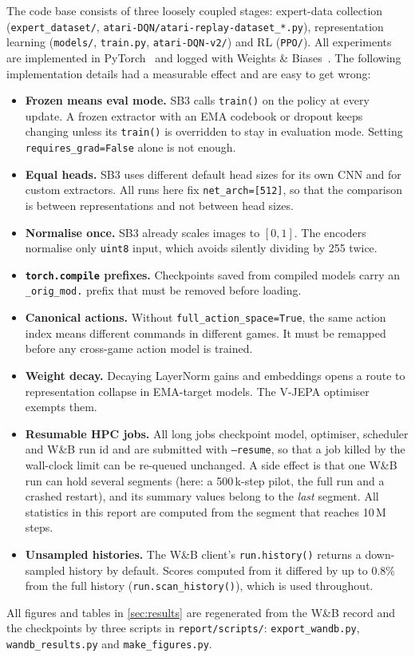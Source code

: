 \documentclass[runningheads]{llncs}
\begin{document}
The code base consists of three loosely coupled stages: expert-data collection
(\texttt{expert\_dataset/}, \texttt{atari-DQN/atari-replay-dataset\_*.py}), representation
learning (\texttt{models/}, \texttt{train.py}, \texttt{atari-DQN-v2/}) and RL
(\texttt{PPO/}). All experiments are implemented in PyTorch~\cite{paszke2019pytorch} and
logged with Weights \& Biases~\cite{biewald2020wandb}. The following implementation
details had a measurable effect and are easy to get wrong:
\begin{itemize}
  \item \textbf{Frozen means eval mode.} SB3 calls \texttt{train()} on the policy at every
  update. A frozen extractor with an EMA codebook or dropout keeps changing unless its
  \texttt{train()} is overridden to stay in evaluation mode. Setting
  \texttt{requires\_grad=False} alone is not enough.
  \item \textbf{Equal heads.} SB3 uses different default head sizes for its own CNN and for
  custom extractors. All runs here fix \texttt{net\_arch=[512]}, so that the comparison is
  between representations and not between head sizes.
  \item \textbf{Normalise once.} SB3 already scales images to $[0,1]$. The encoders
  normalise only \texttt{uint8} input, which avoids silently dividing by 255 twice.
  \item \textbf{\texttt{torch.compile} prefixes.} Checkpoints saved from compiled models
  carry an \texttt{\_orig\_mod.} prefix that must be removed before loading.
  \item \textbf{Canonical actions.} Without \texttt{full\_action\_space=True}, the same action
  index means different commands in different games. It must be remapped before any
  cross-game action model is trained.
  \item \textbf{Weight decay.} Decaying LayerNorm gains and embeddings opens a route to
  representation collapse in EMA-target models. The V-JEPA optimiser exempts them.
  \item \textbf{Resumable HPC jobs.} All long jobs checkpoint model, optimiser, scheduler
  and W\&B run id and are submitted with \texttt{--resume}, so that a job killed by the
  wall-clock limit can be re-queued unchanged. A side effect is that one W\&B run can hold
  several segments (here: a 500\,k-step pilot, the full run and a crashed restart), and its
  summary values belong to the \emph{last} segment. All statistics in this report are
  computed from the segment that reaches 10\,M steps.
  \item \textbf{Unsampled histories.} The W\&B client's \texttt{run.history()} returns a
  down-sampled history by default. Scores computed from it differed by up to 0.8\% from the
  full history (\texttt{run.scan\_history()}), which is used throughout.
\end{itemize}
{\sloppy All figures and tables in \cref{sec:results} are regenerated from the W\&B
record and the checkpoints by three scripts in \texttt{report/scripts/}:
\texttt{export\_wandb.py}, \texttt{wandb\_results.py} and \texttt{make\_figures.py}.\par}
\end{document}
